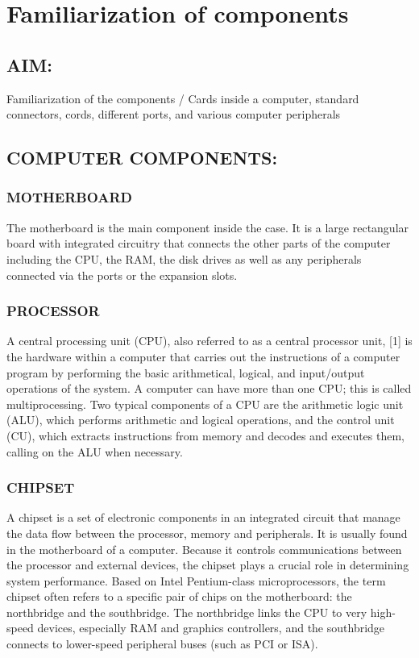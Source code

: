 \documentclass[a4paper,28pt]{report}
\begin{document}
%
%
\pagestyle{empty}
\tableofcontents
\cleardoublepage
\pagestyle{plain}
%
\chapter{Familiarization of components}
%
%
%
\section*{AIM:}
	Familiarization of the components / Cards inside a computer, standard connectors, cords, different ports,
	and various computer peripherals
	
\section*{COMPUTER COMPONENTS:}
\subsection*{MOTHERBOARD}
	The motherboard is the main component inside the case. It is a large rectangular board with integrated circuitry
	that connects the other parts of the computer including the CPU, the RAM, the disk drives as well as any peripherals 	connected via the ports or the expansion slots.
\subsection*{PROCESSOR}
	A central processing unit (CPU), also referred to as a central processor unit,
	[1] is the hardware within
	a computer that carries out the instructions of a computer program by performing the basic arithmetical, logical,
	and input/output operations of the system. A computer can have more than one CPU; this is
	called multiprocessing. Two typical components of a CPU are the arithmetic logic unit (ALU), which
	performs arithmetic and logical operations, and the control unit (CU), which extracts instructions
	from memory and decodes and executes them, calling on the ALU when necessary.
\subsection*{CHIPSET}
	A chipset is a set of electronic components in an integrated circuit that manage the data flow between the
	processor, memory and peripherals. It is usually found in the motherboard of a computer. Because it controls 			communications between the
	processor and external devices, the chipset plays a crucial role in determining system performance. Based
	on Intel Pentium-class microprocessors, the term chipset often refers to a specific pair of chips on the
	motherboard: the northbridge and the southbridge. The northbridge links the CPU to very high-speed devices,
	especially RAM and graphics controllers, and the southbridge connects to lower-speed peripheral buses (such
	as PCI or ISA). 
\end{document}
